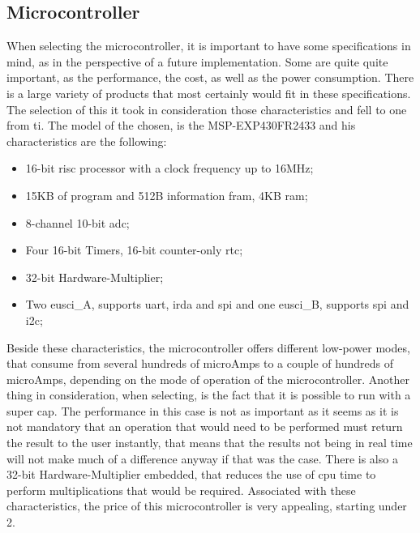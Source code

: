 \subsection{Microcontroller}
When selecting the microcontroller, it is important to have some specifications in mind, as in the perspective of a future implementation. Some are quite quite important, as the performance, the cost, as well as the power consumption. There is a large variety of products that most certainly would fit in these specifications. The selection of this it took in consideration those characteristics and fell to one from \acrlong{ti}. The model of the chosen, is the MSP-EXP430FR2433 and his characteristics are the following:
\begin{itemize}
    \item 16-bit \acrshort{risc} processor with a clock frequency up to 16MHz;
    \item 15KB of program and 512B information \acrshort{fram}, 4KB \acrshort{ram};
    \item 8-channel 10-bit \acrshort{adc};
    \item Four 16-bit Timers, 16-bit counter-only \acrshort{rtc};
    \item 32-bit Hardware-Multiplier;
    \item Two \acrshort{eusci}\_A, supports \acrshort{uart}, \acrshort{irda} and \acrshort{spi} and one \acrshort{eusci}\_B, supports \acrshort{spi} and \acrshort{i2c};
\end{itemize}
Beside these characteristics, the microcontroller offers different low-power modes, that consume from several hundreds of microAmps to a couple of hundreds of microAmps, depending on the mode of operation of the microcontroller. Another thing in consideration, when selecting, is the fact that it is possible to run with a super cap. The performance in this case is not as important as it seems as it is not mandatory that an operation that would need to be performed must return the result to the user instantly, that means that the results not being in real time will not make much of a difference anyway if that was the case. There is also a 32-bit Hardware-Multiplier embedded, that reduces the use of \acrshort{cpu} time to perform multiplications that would be required\cite{MSP430FR2433DataSheet}. Associated with these characteristics, the price of this microcontroller is very appealing, starting under 2\€.

